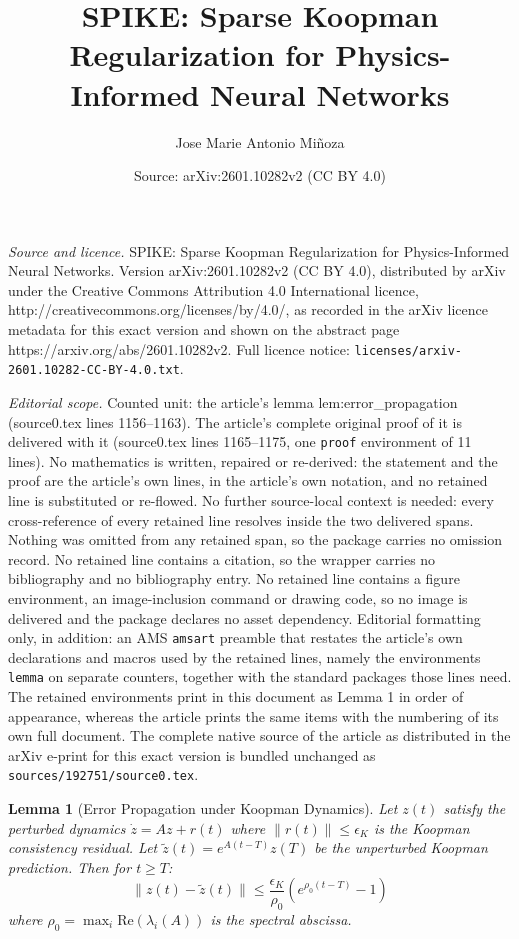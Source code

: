 \documentclass[10pt,a4paper]{amsart}
\title{SPIKE: Sparse Koopman Regularization for Physics-Informed Neural Networks}
\author{Jose Marie Antonio Mi\~noza}
\date{Source: arXiv:2601.10282v2 (CC BY 4.0)}
\newtheorem{lemma}{Lemma}
\begin{document}
\maketitle

\noindent\emph{Source and licence.} SPIKE: Sparse Koopman Regularization for Physics-Informed Neural Networks. Version arXiv:2601.10282v2 (CC BY 4.0), distributed by arXiv under the Creative Commons Attribution 4.0 International licence, http://creativecommons.org/licenses/by/4.0/, as recorded in the arXiv licence metadata for this exact version and shown on the abstract page https://arxiv.org/abs/2601.10282v2. Full licence notice: \texttt{licenses/arxiv-2601.10282-CC-BY-4.0.txt}.\par\smallskip

\noindent\textit{Editorial scope.} Counted unit: the article's lemma lem:error\_propagation (source0.tex lines 1156--1163). The article's complete original proof of it is delivered with it (source0.tex lines 1165--1175, one \texttt{proof} environment of 11 lines). No mathematics is written, repaired or re-derived: the statement and the proof are the article's own lines, in the article's own notation, and no retained line is substituted or re-flowed.  No further source-local context is needed: every cross-reference of every retained line resolves inside the two delivered spans.  Nothing was omitted from any retained span, so the package carries no omission record.  No retained line contains a citation, so the wrapper carries no bibliography and no bibliography entry.  No retained line contains a figure environment, an image-inclusion command or drawing code, so no image is delivered and the package declares no asset dependency.  Editorial formatting only, in addition: an AMS \texttt{amsart} preamble that restates the article's own declarations and macros used by the retained lines, namely the environments \texttt{lemma} on separate counters, together with the standard packages those lines need.  The retained environments print in this document as Lemma 1 in order of appearance, whereas the article prints the same items with the numbering of its own full document.  The complete native source of the article as distributed in the arXiv e-print for this exact version is bundled unchanged as \texttt{sources/192751/source0.tex}.
\begin{lemma}[Error Propagation under Koopman Dynamics]
\label{lem:error_propagation}
Let $z(t)$ satisfy the perturbed dynamics $\dot{z} = Az + r(t)$ where $\|r(t)\| \leq \epsilon_K$ is the Koopman consistency residual. Let $\tilde{z}(t) = e^{A(t-T)}z(T)$ be the unperturbed Koopman prediction. Then for $t \geq T$:
\begin{equation}
\|z(t) - \tilde{z}(t)\| \leq \frac{\epsilon_K}{\rho_0}\left(e^{\rho_0(t-T)} - 1\right)
\end{equation}
where $\rho_0 = \max_i \text{Re}(\lambda_i(A))$ is the spectral abscissa.
\end{lemma}
\end{document}
